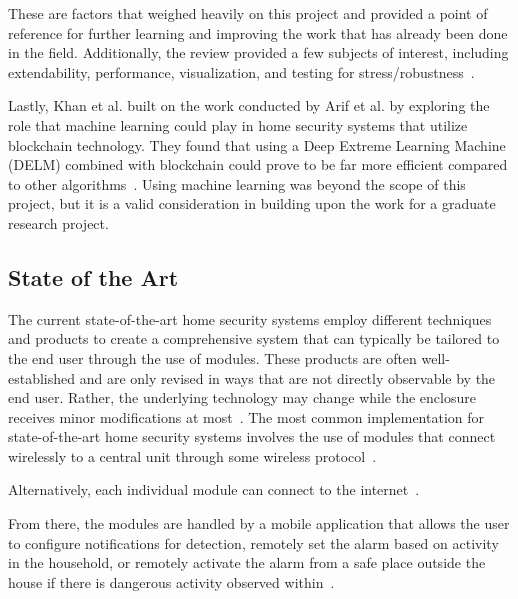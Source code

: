 These are factors that weighed heavily on this project and provided a point of reference for further learning
and improving the work that has already been done in the field. %
Additionally, the review provided a few subjects of interest, including extendability, performance, visualization,
and testing for stress/robustness~\cite{sarhan2020}. %

Lastly, Khan et al. %
built on the work conducted by Arif et al. %
by exploring the role that machine learning could play in home security systems that utilize blockchain technology. %
They found that using a Deep Extreme Learning Machine (DELM) combined with blockchain could
prove to be far more efficient compared to other algorithms~\cite{khanEtAl2021}. %
Using machine learning was beyond the scope of this project, but it is a valid
consideration in building upon the work for a graduate research project. %

\subsection{State of the Art}\label{subsec:state-of-the-art}

The current state-of-the-art home security systems employ different techniques and products
to create a comprehensive system that can typically be tailored to the end user through
the use of modules. %
These products are often well-established and are only revised in ways that are not directly observable by the end user. %
Rather, the underlying technology may change while the enclosure receives minor modifications at most~\cite{sarhan2020}. %
The most common implementation for state-of-the-art home security systems involves the
use of modules that connect wirelessly to a central unit through some wireless
protocol~\cite{joseMalekian2017}. %

Alternatively, each individual module can connect to the internet~\cite{sarhan2020}. %

From there, the modules are handled by a mobile application that allows the user to configure notifications for detection, remotely
set the alarm based on activity in the household, or remotely activate the alarm
from a safe place outside the house if there is dangerous activity observed
within~\cite{joseMalekian2017}. %

